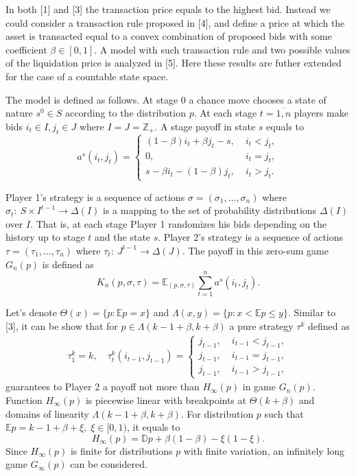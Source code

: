 In both [1] and [3] the transaction price equals to the highest bid. Instead we
could consider a transaction rule proposed in [4], and define a price at which
the asset is transacted equal to a convex combination of proposed bids with some
coefficient $\beta \in [0, 1]$. A model with such transaction rule and two
possible values of the liquidation price is analyzed in [5]. Here these results
are futher extended for the case of a countable state space.

The model is defined as follows. At stage 0 a chance move chooses a state of
nature $s^0 \in S$ according to the distribution $p$. At each stage $t =
\overline{1,n}$ players make bids $i_t \in I, j_t \in J$ where $I = J =
\mathbb{Z}_+$. A stage payoff in state $s$ equals to
\begin{equation*}
  a^s(i_t, j_t) =
  \begin{cases}
    (1-\beta) i_t + \beta j_t - s, &\; i_t < j_t,\\
    0, &\; i_t = j_t,\\
    s - \beta i_t - (1-\beta) j_t, &\; i_t > j_t.
  \end{cases}
\end{equation*}

Player 1's strategy is a sequence of actions $\sigma = (\sigma_1, \ldots,
\sigma_n)$ where $\sigma_t:~S \times I^{t-1} \rightarrow \Delta(I)$ is a mapping
to the set of probability distributions $\Delta(I)$ over $I$. That is, at each
stage Player 1 randomizes his bids depending on the history up to stage $t$ and
the state $s$. Player 2's strategy is a sequence of actions $\tau = (\tau_1,
\ldots, \tau_n)$ where $\tau_t:~J^{t-1} \rightarrow \Delta(J)$. The payoff in
this zero-sum game $G_n(p)$ is defined as
\begin{equation*}
  K_n(p, \sigma, \tau) = \mathbb{E}_{(p, \sigma, \tau)} \sum_{t=1}^n a^s(i_t,j_t).
\end{equation*}

Let's denote $\Theta(x) = \{p: \mathbb{E} p = x\}$ and $\Lambda(x, y) = \{p: x <
\mathbb{E}p \leq y \}$. Similar to [3], it can be show that for $p \in
\Lambda(k-1+\beta, k+\beta)$ a pure strategy $\tau^k$ defined as
\begin{gather*}
  \tau_1^k = k, \quad \tau_t^k(i_{t-1}, j_{t-1}) =
  \begin{cases}
    j_{t-1}, &\; i_{t-1} < j_{t-1},\\
    j_{t-1}, &\; i_{t-1} = j_{t-1},\\
    j_{t-1}, &\; i_{t-1} > j_{t-1},
  \end{cases}
\end{gather*}
guarantees to Player 2 a payoff not more than $H_\infty(p)$ in game $G_n(p)$.
Function $H_\infty(p)$ is piecewise linear with breakpoints at $\Theta(k+\beta)$
and domains of linearity $\Lambda(k-1+\beta, k+\beta)$. For distribution $p$
such that $\mathbb{E} p = k - 1 + \beta + \xi, \; \xi \in [0, 1)$, it equals to
\begin{equation*}
  H_\infty(p) = \mathbb{D} p + \beta(1-\beta) -\xi(1-\xi).
\end{equation*}
Since $H_\infty(p)$ is finite for distributions $p$ with finite variation, an
infinitely long game $G_\infty(p)$ can be considered.


